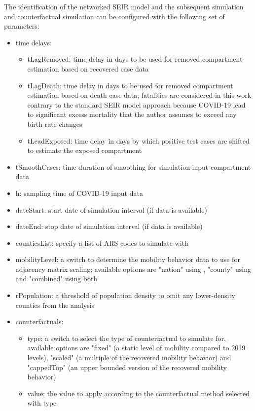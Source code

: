 The identification of the networked SEIR model and the subsequent simulation and counterfactual simulation can be configured with the following set of parameters:
\begin{itemize}
	\item time delays:
	\begin{itemize}
		\item tLagRemoved: time delay in days to be used for removed compartment estimation based on recovered case data
		\item tLagDeath: time delay in days to be used for removed compartment estimation based on death case data; fatalities are considered in this work contrary to the standard SEIR model approach because COVID-19 lead to significant excess mortality \cite{worldhealthorganizationTrueDeathToll} that the author assumes to exceed any birth rate changes
		\item tLeadExposed: time delay in days by which positive test cases are shifted to estimate the exposed compartment
	\end{itemize}
	\item tSmoothCases: time duration of smoothing for simulation input compartment data
	\item h: sampling time of COVID-19 input data
	\item dateStart: start date of simulation interval (if data is available)
	\item dateEnd: stop date of simulation interval (if data is available)
	\item countiesList: specify a list of ARS codes to simulate with
	\item mobilityLevel: a switch to determine the mobility behavior data to use for adjacency matrix scaling; available options are "nation" using \cite{statistischesbundesamtdestatisVerkehrsmittelImFernverkehr2021}, "county" using \cite{statistischesbundesamtdestatisVeranderungsrateMobilitatGgu2021} and "combined" using both
	\item rPopulation: a threshold of population density to omit any lower-density counties from the analysis
	\item counterfactuals:
	\begin{itemize}
		\item type: a switch to select the type of counterfactual to simulate for, available options are "fixed" (a static level of mobility compared to 2019 levels), "scaled" (a multiple of the recovered mobility behavior) and "cappedTop" (an upper bounded version of the recovered mobility behavior)
		\item value: the value to apply according to the counterfactual method selected with type
	\end{itemize}
\end{itemize}
